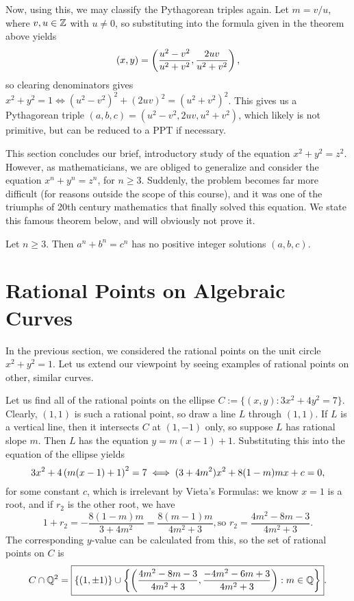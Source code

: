 \documentclass{article}
\begin{document}
Now, using this, we may classify the Pythagorean triples again. Let $m = v/u$, where $v,u\in\mathbb Z$ with $u\neq 0$, so substituting into the formula given in the theorem above yields
$$(x,y) = \left(\frac{u^2-v^2}{u^2+v^2}, \frac{2uv}{u^2+v^2} \right),$$
so clearing denominators gives $x^2+y^2=1\iff (u^2-v^2)^2 + (2uv)^2 = (u^2+v^2)^2$. This gives us a Pythagorean triple $(a,b,c) = (u^2 - v^2, 2uv, u^2+v^2)$, which likely is not primitive, but can be reduced to a PPT if necessary.

\vspace{0.2 cm}
This section concludes our brief, introductory study of the equation $x^2 + y^2 = z^2$. However, as mathematicians, we are obliged to generalize and consider the equation $x^n + y^n = z^n$, for $n\geq 3$. Suddenly, the problem becomes far more difficult (for reasons outside the scope of this course), and it was one of the triumphs of 20th century mathematics that finally solved this equation. We state this famous theorem below, and will obviously not prove it.
\begin{theorem}
Let $n\geq 3$. Then $a^n + b^n = c^n$ has no positive integer solutions $(a,b,c)$.
\end{theorem}

\setcounter{section}{22}
\section{Rational Points on Algebraic Curves}
In the previous section, we considered the rational points on the unit circle $x^2 + y^2 = 1$. Let us extend our viewpoint by seeing examples of rational points on other, similar curves.
\newpage
\begin{example}
Let us find all of the rational points on the ellipse $C:= \{(x,y): 3x^2 + 4y^2 = 7\}$. Clearly, $(1,1)$ is such a rational point, so draw a line $L$ through $(1,1)$. If $L$ is a vertical line, then it intersects $C$ at $(1, -1)$ only, so suppose $L$ has rational slope $m$. Then $L$ has the equation $y = m(x-1) + 1$. Substituting this into the equation of the ellipse yields
$$3x^2 + 4\left(m(x-1) + 1 \right)^2 = 7 \iff (3+4m^2)x^2 + 8(1-m)mx + c = 0,$$
for some constant $c$, which is irrelevant by Vieta's Formulas: we know $x = 1$ is a root, and if $r_2$ is the other root, we have
$$1 + r_2 = -\frac{8(1-m)m}{3+4m^2} = \frac{8(m-1)m}{4m^2 + 3}, \text{so } r_2 = \frac{4m^2-8m-3}{4m^2+3}.$$
The corresponding $y$-value can be calculated from this, so the set of rational points on $C$ is
$$C \cap \mathbb Q^2 = \boxed{\{(1,\pm 1)\} \cup \left\{\left(\frac{4m^2 - 8m-3}{4m^2+3}, \frac{-4m^2-6m+3}{4m^2+3} \right): m\in \mathbb Q\right\}}.$$
\end{example}
\end{document}
